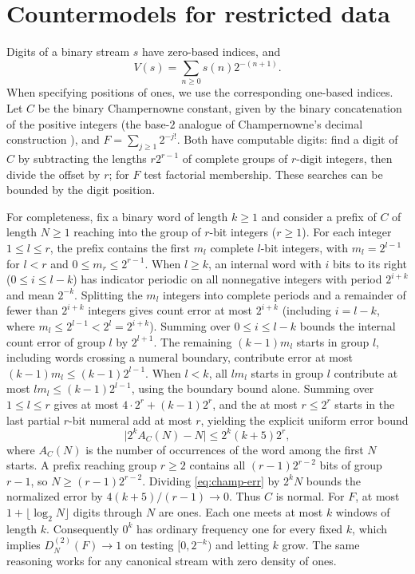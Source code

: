 \documentclass[11pt]{article}
\begin{document}
\section{Countermodels for restricted data}\label{sec:pairs}

Digits of a binary stream \(s\) have zero-based indices, and
\[
  V(s)=\sum_{n\ge0}s(n)2^{-(n+1)}.
\]
When specifying positions of ones, we use the corresponding one-based indices. Let \(C\) be the binary Champernowne constant, given by the binary concatenation of the positive integers (the base-\(2\) analogue of Champernowne's decimal construction \cite{champernowne}), and \(F=\sum_{j\ge1}2^{-j!}\). Both have computable digits: find a digit of \(C\) by subtracting the lengths \(r2^{r-1}\) of complete groups of \(r\)-digit integers, then divide the offset by \(r\); for \(F\) test factorial membership. These searches can be bounded by the digit position.

For completeness, fix a binary word of length \(k\ge1\) and consider a prefix of \(C\) of length \(N\ge1\) reaching into the group of \(r\)-bit integers (\(r\ge1\)). For each integer \(1\le l\le r\), the prefix contains the first \(m_l\) complete \(l\)-bit integers, with \(m_l=2^{l-1}\) for \(l<r\) and \(0\le m_r\le 2^{r-1}\). When \(l\ge k\), an internal word with \(i\) bits to its right (\(0\le i\le l-k\)) has indicator periodic on all nonnegative integers with period \(2^{i+k}\) and mean \(2^{-k}\). Splitting the \(m_l\) integers into complete periods and a remainder of fewer than \(2^{i+k}\) integers gives count error at most \(2^{i+k}\) (including \(i=l-k\), where \(m_l\le 2^{l-1}<2^l=2^{i+k}\)). Summing over \(0\le i\le l-k\) bounds the internal count error of group \(l\) by \(2^{l+1}\). The remaining \((k-1)m_l\) starts in group \(l\), including words crossing a numeral boundary, contribute error at most \((k-1)m_l\le (k-1)2^{l-1}\). When \(l<k\), all \(l m_l\) starts in group \(l\) contribute at most \(l m_l\le(k-1)2^{l-1}\), using the boundary bound alone. Summing over \(1\le l\le r\) gives at most \(4\cdot 2^r+(k-1)2^r\), and the at most \(r\le 2^r\) starts in the last partial \(r\)-bit numeral add at most \(r\), yielding the explicit uniform error bound
\begin{equation}\label{eq:champ-err}
 \bigl|2^k A_C(N)-N\bigr|\le 2^k(k+5)2^r,
\end{equation}
where \(A_C(N)\) is the number of occurrences of the word among the first \(N\) starts. A prefix reaching group \(r\ge2\) contains all \((r-1)2^{r-2}\) bits of group \(r-1\), so \(N\ge(r-1)2^{r-2}\). Dividing \eqref{eq:champ-err} by \(2^k N\) bounds the normalized error by \(4(k+5)/(r-1)\to0\). Thus \(C\) is normal. For \(F\), at most \(1+\lfloor\log_2 N\rfloor\) digits through \(N\) are ones. Each one meets at most \(k\) windows of length \(k\). Consequently \(0^k\) has ordinary frequency one for every fixed \(k\), which implies \(D_N^{(2)}(F)\to1\) on testing \([0,2^{-k})\) and letting \(k\) grow. The same reasoning works for any canonical stream with zero density of ones.
\end{document}
